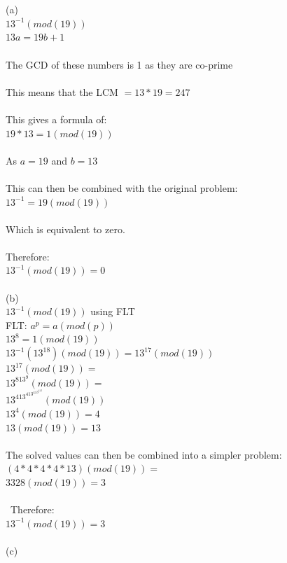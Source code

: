 \documentclass{article}
\begin{document}
\begin{solution}
\\\\(a)
\\ $13^{-1}(mod (19))$
\\ $13a = 19b + 1$
\\\\ The GCD of these numbers is 1 as they are co-prime
\\\\ This means that the LCM $ = 13*19 = 247$
\\\\ This gives a formula of:
\\ $19*13 = 1(mod(19))$
\\\\ As $a = 19$ and $b = 13$
\\\\ This can then be combined with the original problem:
\\ $13^{-1} = 19(mod(19))$
\\\\ Which is equivalent to zero.
\\\\ Therefore:
\\ $13^{-1}(mod (19)) = 0$
\newline
\\\\ (b)
\\ $13^{-1}(mod (19))$ using FLT
\\ FLT: $a^p = a(mod(p))$
\\ $13^8 = 1(mod(19))$
\\ $13^{-1}(13^{18})(mod(19)) = 13^{17}(mod(19))$
\\ $13^{17}(mod(19)) = $
\\ $13^813^9(mod(19)) = $
\\ $13^413^413^413^413(mod(19))$
\\ $13^4(mod(19)) = 4$
\\ $13(mod(19)) = 13$
\\\\ The solved values can then be combined into a simpler problem:
\\ $(4*4*4*4*13)(mod(19)) = $
\\ $3328(mod(19)) = 3$
\\\\\ Therefore:
\\ $13^{-1}(mod (19)) = 3$
\newline
\\\\ (c)

\end{solution}
\end{document}
